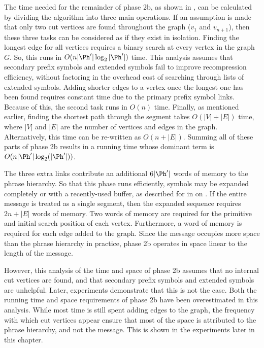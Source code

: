 The time needed for the remainder of phase 2b, as shown in 
, can be calculated by dividing the algorithm
into three main operations.  If
an assumption is made that only two
cut vertices are found throughout the graph ($v_1$ and $v_{n+1}$),
then these three tasks can be considered as if they exist 
in isolation.  Finding
the longest edge for all vertices requires
a binary search at every vertex in the graph $G$.  So, this
runs in $O(n|\Ph'| \log_2 |\Ph'|)$ time.
This analysis assumes that secondary prefix symbols and extended symbols
fail to improve recompression efficiency, without factoring in the 
overhead cost of
searching through lists of extended symbols.  Adding shorter
edges to a vertex once the longest one has been found requires constant
time due to the primary prefix symbol links.  Because of this, the
second task runs in $O(n)$ time.  Finally, as mentioned earlier,
finding the shortest path through the segment takes $O(|V| + |E|)$ time,
where $|V|$ and $|E|$ are the number of vertices and edges in the 
graph.  Alternatively, this time can be re-written as $O(n + |E|)$.  
Summing all of these parts of phase 2b results in a running time
whose dominant term is $O(n|\Ph'| \log_2 (|\Ph'|))$.

The three extra links contribute an additional
$6|\Ph'|$ words of memory to the phrase hierarchy.  So that this phase
runs efficiently, symbols may be expanded completely or with a recently-used
buffer,
as described for \despair in  on 
.  If the entire message is treated as a single
segment, then the expanded sequence requires $2n + |E|$ words of memory.  Two
words of memory are required for the primitive and initial search position of
each vertex.  Furthermore, a word of memory is required for each edge added
to the graph.  Since the message occupies more space than the phrase hierarchy
in practice, phase 2b operates in space linear to the length of the message.

However, this analysis of the time and space of phase 2b assumes that
no internal cut vertices are found, and that secondary prefix symbols
and extended symbols are unhelpful.  Later, experiments demonstrate
that this is not the case.  
Both the running time and space requirements of phase 2b have been 
overestimated in this analysis.  While most time is still spent
adding edges to the graph, the frequency with which cut vertices appear
ensure that most of the space is attributed to the phrase
hierarchy, and not the message.  This is shown in the experiments later
in this chapter.


